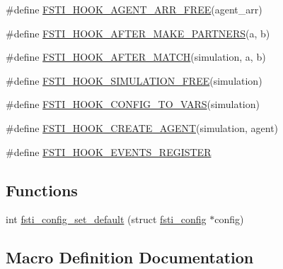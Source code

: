 \begin{DoxyCompactItemize}
\item 
\#define \mbox{\hyperlink{fsti-defaults_8h_a02a2fb1caec540e1c1d364b37ee7dcdf}{F\+S\+T\+I\+\_\+\+H\+O\+O\+K\+\_\+\+A\+G\+E\+N\+T\+\_\+\+A\+R\+R\+\_\+\+F\+R\+EE}}(agent\+\_\+arr)
\item 
\#define \mbox{\hyperlink{fsti-defaults_8h_a70184631a66cf835159c37db6b145a74}{F\+S\+T\+I\+\_\+\+H\+O\+O\+K\+\_\+\+A\+F\+T\+E\+R\+\_\+\+M\+A\+K\+E\+\_\+\+P\+A\+R\+T\+N\+E\+RS}}(a,  b)
\item 
\#define \mbox{\hyperlink{fsti-defaults_8h_a2799df986d42080afd9cd8e98e8f9e6c}{F\+S\+T\+I\+\_\+\+H\+O\+O\+K\+\_\+\+A\+F\+T\+E\+R\+\_\+\+M\+A\+T\+CH}}(simulation,  a,  b)
\item 
\#define \mbox{\hyperlink{fsti-defaults_8h_ad642cdfb6c422b0cacba4620b959dbd9}{F\+S\+T\+I\+\_\+\+H\+O\+O\+K\+\_\+\+S\+I\+M\+U\+L\+A\+T\+I\+O\+N\+\_\+\+F\+R\+EE}}(simulation)
\item 
\#define \mbox{\hyperlink{fsti-defaults_8h_a3a7ef20fa909e6260788f2af6efc3aca}{F\+S\+T\+I\+\_\+\+H\+O\+O\+K\+\_\+\+C\+O\+N\+F\+I\+G\+\_\+\+T\+O\+\_\+\+V\+A\+RS}}(simulation)
\item 
\#define \mbox{\hyperlink{fsti-defaults_8h_ad16639c93ae02d6c0aeb0861271d3666}{F\+S\+T\+I\+\_\+\+H\+O\+O\+K\+\_\+\+C\+R\+E\+A\+T\+E\+\_\+\+A\+G\+E\+NT}}(simulation,  agent)
\item 
\#define \mbox{\hyperlink{fsti-defaults_8h_ae0dc24adedcc11d693ecfd29edf90434}{F\+S\+T\+I\+\_\+\+H\+O\+O\+K\+\_\+\+E\+V\+E\+N\+T\+S\+\_\+\+R\+E\+G\+I\+S\+T\+ER}}
\end{DoxyCompactItemize}
\subsection*{Functions}
\begin{DoxyCompactItemize}
\item 
int \mbox{\hyperlink{fsti-defaults_8h_ac17ffcd08e1c5eff41d7a65f637c4b06}{fsti\+\_\+config\+\_\+set\+\_\+default}} (struct \mbox{\hyperlink{structfsti__config}{fsti\+\_\+config}} $\ast$config)
\end{DoxyCompactItemize}


\subsection{Macro Definition Documentation}
\mbox{\label{fsti-defaults_8h_afddc44c41cd9a27367b2e0b713a8d8db}} 
